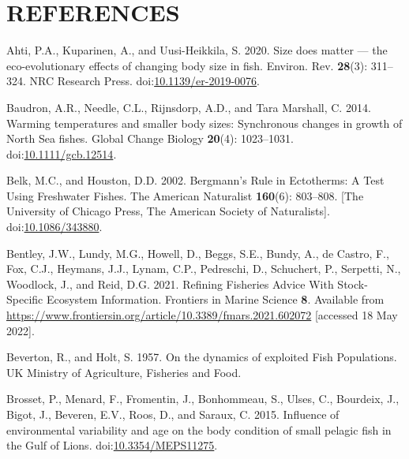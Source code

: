 \documentclass[
]{article}
\newlength{\cslhangindent}
\newlength{\cslentryspacingunit} %
\newenvironment{CSLReferences}[2] %
 {%
  \setlength{\parindent}{0pt}
  \ifodd #1
  \let\oldpar\par
  \def\par{\hangindent=\cslhangindent\oldpar}
  \fi
  \setlength{\parskip}{#2\cslentryspacingunit}
 }%
 {}
\begin{document}
\newpage

\hypertarget{references}{%
\section*{REFERENCES}\label{references}}

\hypertarget{refs}{}
\begin{CSLReferences}{1}{0}
\leavevmode{}%
Ahti, P.A., Kuparinen, A., and Uusi-Heikkila, S. 2020. Size does matter --- the eco-evolutionary effects of changing body size in fish. Environ. Rev. \textbf{28}(3): 311--324. {NRC Research Press}. doi:\href{https://doi.org/10.1139/er-2019-0076}{10.1139/er-2019-0076}.

\leavevmode{}%
Baudron, A.R., Needle, C.L., Rijnsdorp, A.D., and Tara Marshall, C. 2014. Warming temperatures and smaller body sizes: Synchronous changes in growth of {North Sea} fishes. Global Change Biology \textbf{20}(4): 1023--1031. doi:\href{https://doi.org/10.1111/gcb.12514}{10.1111/gcb.12514}.

\leavevmode{}%
Belk, M.C., and Houston, D.D. 2002. Bergmann's {Rule} in {Ectotherms}: {A Test Using Freshwater Fishes}. The American Naturalist \textbf{160}(6): 803--808. {{[}The University of Chicago Press, The American Society of Naturalists{]}}. doi:\href{https://doi.org/10.1086/343880}{10.1086/343880}.

\leavevmode{}%
Bentley, J.W., Lundy, M.G., Howell, D., Beggs, S.E., Bundy, A., de Castro, F., Fox, C.J., Heymans, J.J., Lynam, C.P., Pedreschi, D., Schuchert, P., Serpetti, N., Woodlock, J., and Reid, D.G. 2021. Refining {Fisheries Advice With Stock-Specific Ecosystem Information}. Frontiers in Marine Science \textbf{8}. Available from \url{https://www.frontiersin.org/article/10.3389/fmars.2021.602072} {[}accessed 18 May 2022{]}.

\leavevmode{}%
Beverton, R., and Holt, S. 1957. On the dynamics of exploited {Fish Populations}. {UK Ministry of Agriculture, Fisheries and Food}.

\leavevmode{}%
Brosset, P., Menard, F., Fromentin, J., Bonhommeau, S., Ulses, C., Bourdeix, J., Bigot, J., Beveren, E.V., Roos, D., and Saraux, C. 2015. Influence of environmental variability and age on the body condition of small pelagic fish in the {Gulf} of {Lions}. doi:\href{https://doi.org/10.3354/MEPS11275}{10.3354/MEPS11275}.


\end{CSLReferences}
\end{document}
